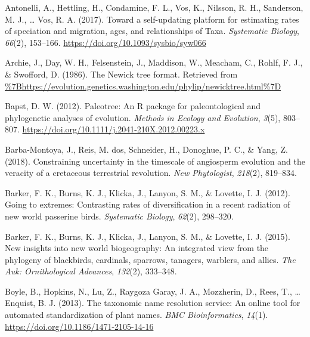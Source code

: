 \documentclass[
  english,
  man]{apa6}
\newlength{\cslhangindent}
\newlength{\cslentryspacingunit} %
\newenvironment{CSLReferences}[2] %
 {%
  \setlength{\parindent}{0pt}
  \ifodd #1
  \let\oldpar\par
  \def\par{\hangindent=\cslhangindent\oldpar}
  \fi
  \setlength{\parskip}{#2\cslentryspacingunit}
 }%
 {}
\begin{document}
\hypertarget{refs}{}
\begin{CSLReferences}{1}{0}
\leavevmode{}%
Antonelli, A., Hettling, H., Condamine, F. L., Vos, K., Nilsson, R. H., Sanderson, M. J., \ldots{} Vos, R. A. (2017). {Toward a self-updating platform for estimating rates of speciation and migration, ages, and relationships of Taxa}. \emph{Systematic Biology}, \emph{66}(2), 153--166. \url{https://doi.org/10.1093/sysbio/syw066}

\leavevmode{}%
Archie, J., Day, W. H., Felsenstein, J., Maddison, W., Meacham, C., Rohlf, F. J., \& Swofford, D. (1986). {The Newick tree format}. Retrieved from \url{\%7Bhttps://evolution.genetics.washington.edu/phylip/newicktree.html\%7D}

\leavevmode{}%
Bapst, D. W. (2012). {Paleotree: An R package for paleontological and phylogenetic analyses of evolution}. \emph{Methods in Ecology and Evolution}, \emph{3}(5), 803--807. \url{https://doi.org/10.1111/j.2041-210X.2012.00223.x}

\leavevmode{}%
Barba-Montoya, J., Reis, M. dos, Schneider, H., Donoghue, P. C., \& Yang, Z. (2018). Constraining uncertainty in the timescale of angiosperm evolution and the veracity of a cretaceous terrestrial revolution. \emph{New Phytologist}, \emph{218}(2), 819--834.

\leavevmode{}%
Barker, F. K., Burns, K. J., Klicka, J., Lanyon, S. M., \& Lovette, I. J. (2012). Going to extremes: Contrasting rates of diversification in a recent radiation of new world passerine birds. \emph{Systematic Biology}, \emph{62}(2), 298--320.

\leavevmode{}%
Barker, F. K., Burns, K. J., Klicka, J., Lanyon, S. M., \& Lovette, I. J. (2015). New insights into new world biogeography: An integrated view from the phylogeny of blackbirds, cardinals, sparrows, tanagers, warblers, and allies. \emph{The Auk: Ornithological Advances}, \emph{132}(2), 333--348.

\leavevmode{}%
Boyle, B., Hopkins, N., Lu, Z., Raygoza Garay, J. A., Mozzherin, D., Rees, T., \ldots{} Enquist, B. J. (2013). {The taxonomic name resolution service: An online tool for automated standardization of plant names}. \emph{BMC Bioinformatics}, \emph{14}(1). \url{https://doi.org/10.1186/1471-2105-14-16}


\end{CSLReferences}
\end{document}
